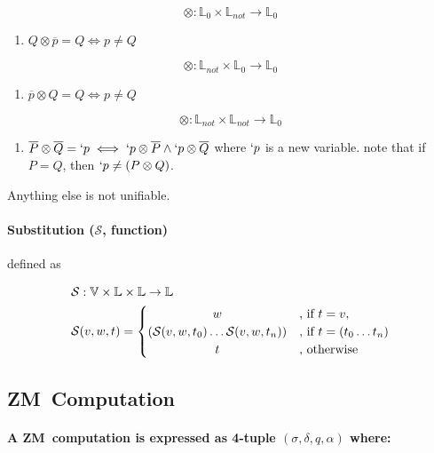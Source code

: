 \documentclass[11pt,a4paper]{report}
\newcommand{\zm}{ZM}
\newcommand{\var}[1]{`#1}
\newcommand{\unify}{\otimes}
\begin{document}
\[
    \unify: \mathbb{L}_{0} \times \mathbb{L}_{not} \rightarrow \mathbb{L}_{0} 
\]

\begin{enumerate}
\item $Q \unify \overline{p} = Q \iff p \neq Q$
\end{enumerate}


\[
    \unify: \mathbb{L}_{not} \times \mathbb{L}_{0} \rightarrow \mathbb{L}_{0} 
\]

\begin{enumerate}
\item $\overline{p} \unify Q = Q \iff p \neq Q$
\end{enumerate}

\[
    \unify: \mathbb{L}_{not} \times \mathbb{L}_{not} \rightarrow \mathbb{L}_{0} 
\]

\begin{enumerate}
\item $\overline{P} \unify \overline{Q} = \var{p} \iff \var{p} \unify \overline{P} \wedge \var{p} \unify \overline{Q}$
    \subitem where $\var{p}$ is a new variable.
    \subitem note that if $P = Q$, then $\var{p} \neq (P \unify Q)$. 
\end{enumerate}

Anything else is not unifiable.

\paragraph{Substitution ($\mathcal{S}$, function)} defined as

\begin{align}
    \mathcal{S}&: \mathbb{V} \times \mathbb{L} \times \mathbb{L} \rightarrow \mathbb{L}\\
    \mathcal{S}&(v, w, t) = 
    \begin{cases}
        \hfill w \hfill &\text{, if } t = v,\\
        \hfill (\mathcal{S}(v, w, t_{0}) \ldots \mathcal{S}(v, w, t_{n})) \hfill & \text{, if } t = (t_{0} \ldots t_{n})\\
        \hfill t \hfill & \text{, otherwise}
    \end{cases}
\end{align}



\subsection{\zm\ Computation}
\paragraph{A \zm\ computation is expressed as 4-tuple $(\sigma, \delta, q, \alpha)$ where:}
\end{document}
